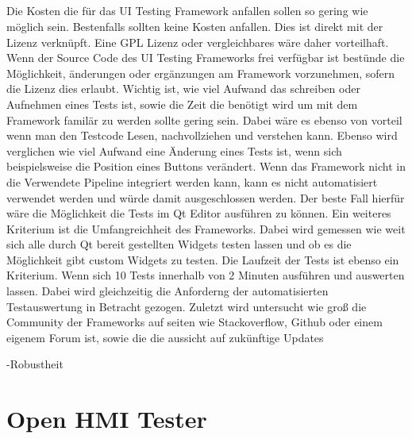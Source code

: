 		\FloatBarrier
		
		\paragraph{} Die Kosten die für das UI Testing Framework anfallen sollen so gering wie möglich sein. Bestenfalls sollten keine Kosten anfallen. Dies ist direkt mit der Lizenz verknüpft. Eine GPL Lizenz oder vergleichbares wäre daher vorteilhaft. Wenn der Source Code des UI Testing Frameworks frei verfügbar ist bestünde die Möglichkeit, änderungen oder ergänzungen am Framework vorzunehmen, sofern die Lizenz dies erlaubt. 
		Wichtig ist, wie viel Aufwand das schreiben oder Aufnehmen eines Tests ist, sowie die Zeit die benötigt wird um mit dem Framework familär zu werden sollte gering sein. Dabei wäre es ebenso von vorteil wenn man den Testcode Lesen, nachvollziehen und verstehen kann. Ebenso wird verglichen wie viel Aufwand eine Änderung eines Tests ist, wenn sich beispielsweise die Position eines Buttons verändert. Wenn das Framework nicht in die Verwendete Pipeline integriert werden kann, kann es nicht automatisiert verwendet werden und würde damit ausgeschlossen werden. Der beste Fall hierfür wäre die Möglichkeit die Tests im Qt Editor ausführen zu können. Ein weiteres Kriterium ist die Umfangreichheit des Frameworks. Dabei wird gemessen wie weit sich alle durch Qt bereit gestellten Widgets testen lassen und ob es die Möglichkeit gibt custom Widgets zu testen. Die Laufzeit der Tests ist ebenso ein Kriterium. Wenn sich 10 Tests innerhalb von 2 Minuten ausführen und auswerten lassen. Dabei wird gleichzeitig die Anforderng der automatisierten Testauswertung in Betracht gezogen. Zuletzt wird untersucht wie groß die Community der Frameworks auf seiten wie Stackoverflow, Github oder einem eigenem Forum ist, sowie die die aussicht auf zukünftige Updates
		
		-Robustheit

\chapter{Open HMI Tester}
		
